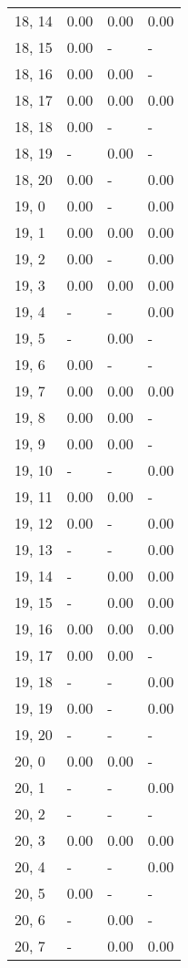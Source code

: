 \begin{table}
\begin{tabular}{llll}
18, 14 &  0.00 &  0.00 &  0.00 \\
18, 15 &  0.00 &     - &     - \\
18, 16 &  0.00 &  0.00 &     - \\
18, 17 &  0.00 &  0.00 &  0.00 \\
18, 18 &  0.00 &     - &     - \\
18, 19 &     - &  0.00 &     - \\
18, 20 &  0.00 &     - &  0.00 \\
19, 0  &  0.00 &     - &  0.00 \\
19, 1  &  0.00 &  0.00 &  0.00 \\
19, 2  &  0.00 &     - &  0.00 \\
19, 3  &  0.00 &  0.00 &  0.00 \\
19, 4  &     - &     - &  0.00 \\
19, 5  &     - &  0.00 &     - \\
19, 6  &  0.00 &     - &     - \\
19, 7  &  0.00 &  0.00 &  0.00 \\
19, 8  &  0.00 &  0.00 &     - \\
19, 9  &  0.00 &  0.00 &     - \\
19, 10 &     - &     - &  0.00 \\
19, 11 &  0.00 &  0.00 &     - \\
19, 12 &  0.00 &     - &  0.00 \\
19, 13 &     - &     - &  0.00 \\
19, 14 &     - &  0.00 &  0.00 \\
19, 15 &     - &  0.00 &  0.00 \\
19, 16 &  0.00 &  0.00 &  0.00 \\
19, 17 &  0.00 &  0.00 &     - \\
19, 18 &     - &     - &  0.00 \\
19, 19 &  0.00 &     - &  0.00 \\
19, 20 &     - &     - &     - \\
20, 0  &  0.00 &  0.00 &     - \\
20, 1  &     - &     - &  0.00 \\
20, 2  &     - &     - &     - \\
20, 3  &  0.00 &  0.00 &  0.00 \\
20, 4  &     - &     - &  0.00 \\
20, 5  &  0.00 &     - &     - \\
20, 6  &     - &  0.00 &     - \\
20, 7  &     - &  0.00 &  0.00 \\

\end{tabular}
\end{table}
